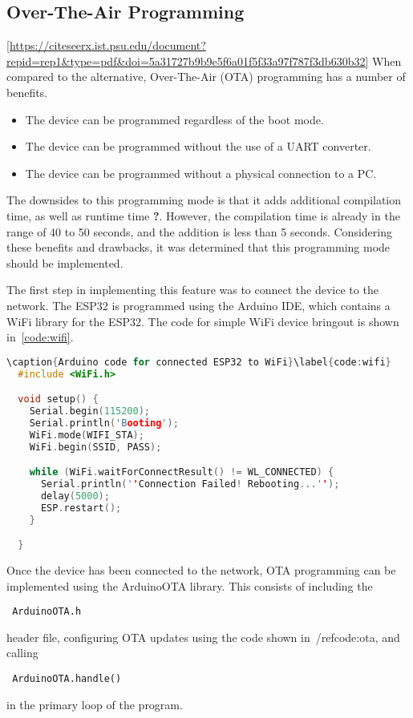\subsection{Over-The-Air Programming}
\ref{https://citeseerx.ist.psu.edu/document?repid=rep1&type=pdf&doi=5a31727b9b9e5f6a01f5f33a97f787f3db630b32}
When compared to the alternative, Over-The-Air (OTA) programming has a number of benefits.

\begin{itemize}
        \item The device can be programmed regardless of the boot mode.
        \item The device can be programmed without the use of a UART converter.
        \item The device can be programmed without a physical connection to a PC.
\end{itemize}

The downsides to this programming mode is that it adds additional compilation time, as well as runtime time \textbf{?}.
However, the compilation time is already in the range of 40 to 50 seconds, and the addition is less than 5 seconds.
Considering these benefits and drawbacks, it was determined that this programming mode should be implemented.

The first step in implementing this feature was to connect the device to the network.
The ESP32 is programmed using the Arduino IDE, which contains a WiFi library for the ESP32.
The code for simple WiFi device bringout is shown in~\ref{code:wifi}.

\begin{lstlisting}[language=C++]
\caption{Arduino code for connected ESP32 to WiFi}\label{code:wifi}
  #include <WiFi.h>

  void setup() {
    Serial.begin(115200);
    Serial.println('Booting');
    WiFi.mode(WIFI_STA);
    WiFi.begin(SSID, PASS);

    while (WiFi.waitForConnectResult() != WL_CONNECTED) {
      Serial.println(''Connection Failed! Rebooting...'');
      delay(5000);
      ESP.restart();
    }

  }
\end{lstlisting}

Once the device has been connected to the network, OTA programming can be implemented using the ArduinoOTA library.
This consists of including the \begin{lstlisting} ArduinoOTA.h \end{lstlisting}
header file, configuring OTA updates using the code shown in~/ref{code:ota},
and calling \begin{lstlisting} ArduinoOTA.handle() \end{lstlisting}
in the primary loop of the program.

